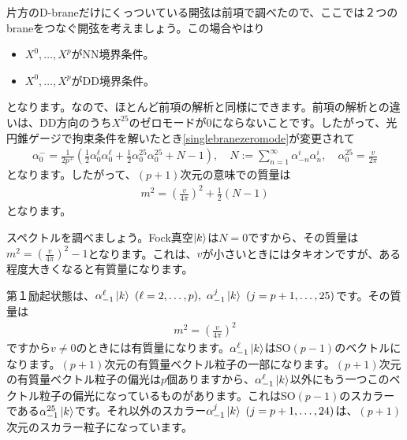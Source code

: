 \documentclass[report,paper=a4, fontsize=12pt, line_length=16cm, number_of_lines=34,dvipdfmx]{jlreq}
\numberwithin{equation}{chapter}
\numberwithin{equation}{section}
\begin{document}
片方のD-braneだけにくっついている開弦は前項で調べたので、ここでは２つのbraneをつなぐ開弦を考えましょう。この場合やはり
\begin{itemize}
  \item $X^0,\dots,X^{p}$がNN境界条件。
  \item $X^0,\dots,X^{p}$がDD境界条件。
\end{itemize}
となります。なので、ほとんど前項の解析と同様にできます。前項の解析との違いは、DD方向のうち$X^{25}$のゼロモードが$0$にならないことです。したがって、光円錐ゲージで拘束条件を解いたとき\eqref{singlebranezeromode}が変更されて
\begin{align}
  \alpha^{-}_{0}=\frac{1}{2p^{+}}\left( \frac12 \alpha_{0}^{\ell}\alpha_{0}^{\ell}+\frac12 \alpha_{0}^{25}\alpha_{0}^{25}+N-1 \right),\quad N:=\sum_{n=1}^{\infty} \alpha_{-n}^{i}\alpha_{n}^{i},\quad \alpha_{0}^{25}=\frac{v}{2\pi}
\end{align}
となります。したがって、$(p+1)$次元の意味での質量は
\begin{align}
  m^2=\left( \frac{v}{4\pi} \right)^2+\frac12(N-1)
\end{align}
となります。

スペクトルを調べましょう。Fock真空$\ket{k}$は$N=0$ですから、その質量は$m^2=\left( \frac{v}{4\pi} \right)^2-1$となります。これは、$v$が小さいときにはタキオンですが、ある程度大きくなると有質量になります。

第１励起状態は、$\alpha_{-1}^{\ell}\ket{k}\  (\ell=2,\dots,p),\ 
\alpha_{-1}^{j}\ket{k}\ (j=p+1,\dots,25)$です。その質量は
\begin{align}
  m^2=\left( \frac{v}{4\pi} \right)^2
\end{align}
ですから$v\ne 0$のときには有質量になります。$\alpha_{-1}^{\ell}\ket{k}$はSO$(p-1)$のベクトルになります。$(p+1)$次元の有質量ベクトル粒子の一部になります。$(p+1)$次元の有質量ベクトル粒子の偏光は$p$個ありますから、$\alpha_{-1}^{\ell}\ket{k}$以外にもう一つこのベクトル粒子の偏光になっているものがあります。これはSO$(p-1)$のスカラーである$\alpha_{-1}^{25}\ket{k}$です。それ以外のスカラー$\alpha_{-1}^{j}\ket{k}\ (j=p+1,\dots,24)$は、$(p+1)$次元のスカラー粒子になっています。
\end{document}
